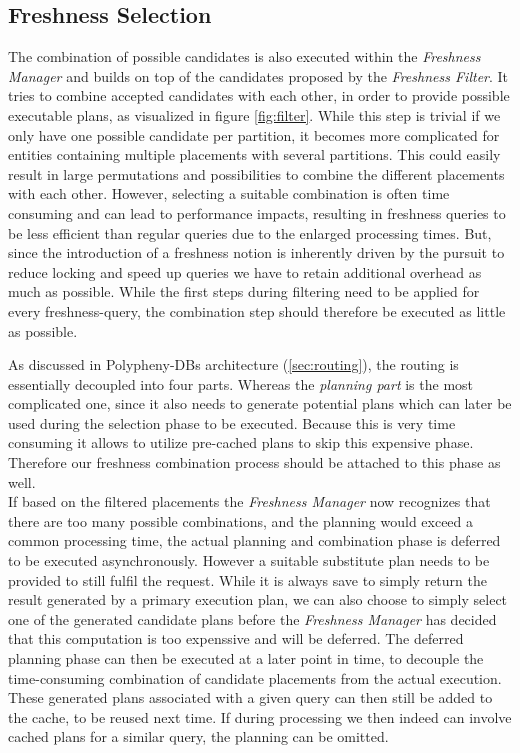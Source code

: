 

\subsection{Freshness Selection}
\label{sec:fresh_select}

The combination of possible candidates is also executed within the \emph{Freshness Manager} and builds on top of the candidates proposed by the \emph{Freshness Filter}.
It tries to combine accepted candidates with each other, in order to provide possible executable plans, as visualized in figure \ref{fig:filter}.
While this step is trivial if we only have one possible candidate per partition, it becomes more complicated for entities containing multiple placements 
with several partitions. This could easily result in large permutations and possibilities to combine the different placements with each other.
However, selecting a suitable combination is often time consuming and can lead to performance impacts, 
resulting in freshness queries to be less efficient than regular queries due to the enlarged processing times. 
But, since the introduction of a freshness notion is inherently driven by the pursuit to reduce locking and speed up queries we have to 
retain additional overhead as much as possible. 
While the first steps during filtering need to be applied for every freshness-query, the combination step should therefore be executed as little as possible.

As discussed in Polypheny-DBs architecture (\ref{sec:routing}), the routing is essentially decoupled into four parts.
Whereas the \emph{planning part} is the most complicated one, since it also needs to generate potential plans which can later be used during the selection phase 
to be executed. Because this is very time consuming it allows to utilize pre-cached plans to skip this expensive phase.
Therefore our freshness combination process should be attached to this phase as well. \\

If based on the filtered placements the \emph{Freshness Manager} now recognizes that there are too many possible combinations, and the planning would 
exceed a common processing time, the actual planning and combination phase is deferred to be executed asynchronously.
However a suitable substitute plan needs to be provided to still fulfil the request.
While it is always save to simply return the result generated by a primary execution plan, we can also choose to simply select one of the generated candidate plans before
the \emph{Freshness Manager} has decided that this computation is too expenssive and will be deferred. 
The deferred planning phase can then be executed at a later point in time, to decouple the time-consuming combination of candidate placements from the actual execution.
These generated plans associated with a given query can then still be added to the cache, to be reused next time.
If during processing we then indeed can involve cached plans for a similar query, the planning can be omitted.\\

